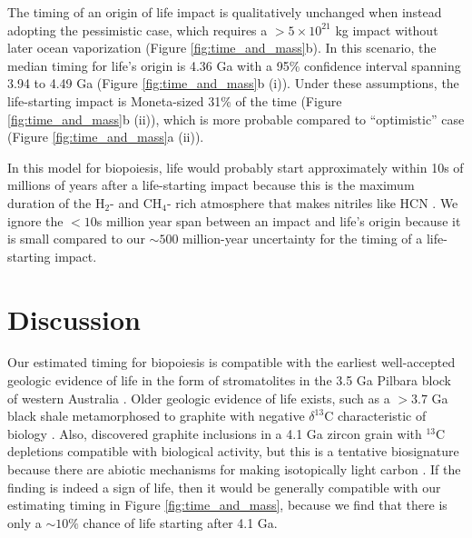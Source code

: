 \documentclass[manuscript]{aastex63}
\begin{document}
The timing of an origin of life impact is qualitatively unchanged when instead adopting the \citet{Wogan_2023} pessimistic case, which requires a $> 5 \times 10^{21}$ kg impact without later ocean vaporization (Figure \ref{fig:time_and_mass}b). In this scenario, the median timing for life's origin is 4.36 Ga with a 95\% confidence interval spanning 3.94 to 4.49 Ga (Figure \ref{fig:time_and_mass}b (i)). Under these assumptions, the life-starting impact is Moneta-sized 31\% of the time (Figure \ref{fig:time_and_mass}b (ii)), which is more probable compared to ``optimistic'' case (Figure \ref{fig:time_and_mass}a (ii)).

In this model for biopoiesis, life would probably start approximately within 10s of millions of years after a life-starting impact because this is the maximum duration of the H$_2$- and CH$_4$- rich atmosphere that makes nitriles like HCN \citep{Wogan_2023}. We ignore the $< 10$s million year span between an impact and life's origin because it is small compared to our $\sim 500$ million-year uncertainty for the timing of a life-starting impact.

\section{Discussion}

Our estimated timing for biopoiesis is compatible with the earliest well-accepted geologic evidence of life in the form of stromatolites in the 3.5 Ga Pilbara block of western Australia \citep{Walter_1980,Buick_1981,Van_2018}. Older geologic evidence of life exists, such as a $> 3.7$ Ga black shale metamorphosed to graphite with negative $\delta^{13}$C characteristic of biology \citep{Rosing_1999,Ohtomo_2014}. Also, \citet{Bell_2015} discovered graphite inclusions in a 4.1 Ga zircon grain with $^{13}$C depletions compatible with biological activity, but this is a tentative biosignature because there are abiotic mechanisms for making isotopically light carbon \citep{Javaux_2019}. If the \citet{Bell_2015} finding is indeed a sign of life, then it would be generally compatible with our estimating timing in Figure \ref{fig:time_and_mass}, because we find that there is only a $\sim 10\%$ chance of life starting after 4.1 Ga.
\end{document}

